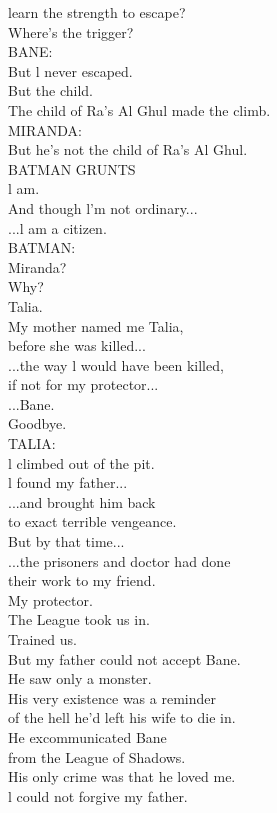 \documentclass{article}
\begin{document}
\begin{multicols}{3}
learn the strength to escape?\\
Where's the trigger?\\
BANE:\\
But l never escaped.\\
But the child.\\
The child of Ra's Al Ghul made the climb.\\
MIRANDA:\\
But he's not the child of Ra's Al Ghul.\\
BATMAN GRUNTS\\
l am.\\
And though l'm not ordinary...\\
...l am a citizen.\\
BATMAN:\\
Miranda?\\
Why?\\
Talia.\\
My mother named me Talia,\\
before she was killed...\\
...the way l would have been killed,\\
if not for my protector...\\
...Bane.\\
Goodbye.\\
TALIA:\\
l climbed out of the pit.\\
l found my father...\\
...and brought him back\\
to exact terrible vengeance.\\
But by that time...\\
...the prisoners and doctor had done\\
their work to my friend.\\
My protector.\\
The League took us in.\\
Trained us.\\
But my father could not accept Bane.\\
He saw only a monster.\\
His very existence was a reminder\\
of the hell he'd left his wife to die in.\\
He excommunicated Bane\\
from the League of Shadows.\\
His only crime was that he loved me.\\
l could not forgive my father.\\

\end{multicols}
\end{document}
